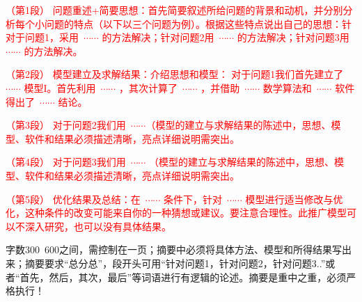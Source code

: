 

{\song\xiaosihao
\setlength{\parindent}{2em}\textcolor{red}{（第1段）	问题重述+简要思想：首先简要叙述所给问题的背景和动机，并分别分析每个小问题的特点（以下以三个问题为例）。根据这些特点说出自己的思想：针对于问题1，采用~$\cdots \cdots$ 的方法解决；针对问题2用~$\cdots \cdots$ 的方法解决；针对问题3用~$\cdots \cdots$ 的方法解决。}


\setlength{\parindent}{2em}\textcolor{red}{（第2段）	模型建立及求解结果：介绍思想和模型： 对于问题1我们首先建立了~$\cdots \cdots$ 模型I。首先利用~$\cdots \cdots$ ，其次计算了~$\cdots \cdots$ ，并借助~$\cdots \cdots$ 数学算法和~$\cdots \cdots$ 软件得出了~$\cdots \cdots$ 结论。}

\setlength{\parindent}{2em} \textcolor{red}{（第3段）	对于问题2我们用~$\cdots \cdots$（模型的建立与求解结果的陈述中，思想、模型、软件和结果必须描述清晰，亮点详细说明需突出。}

\setlength{\parindent}{2em}\textcolor{red}{（第4段）	对于问题3我们用~$\cdots \cdots$ （模型的建立与求解结果的陈述中，思想、模型、软件和结果必须描述清晰，亮点详细说明需突出。}

\setlength{\parindent}{2em}\textcolor{red}{（第5段）	优化结果及总结：在~$\cdots \cdots$ 条件下，针对~$\cdots \cdots$ 模型进行适当修改与优化，这种条件的改变可能来自你的一种猜想或建议。要注意合理性。此推广模型可以不深入研究，也可以没有具体结果。}
}

\begin{rmk}
字数300~600之间，需控制在一页；摘要中必须将具体方法、模型和所得结果写出来；摘要要求“总分总”，段开头可用“针对问题1，针对问题2，针对问题3..”或者“首先，然后，其次，最后”等词语进行有逻辑的论述。摘要是重中之重，必须严格执行！
\end{rmk}





